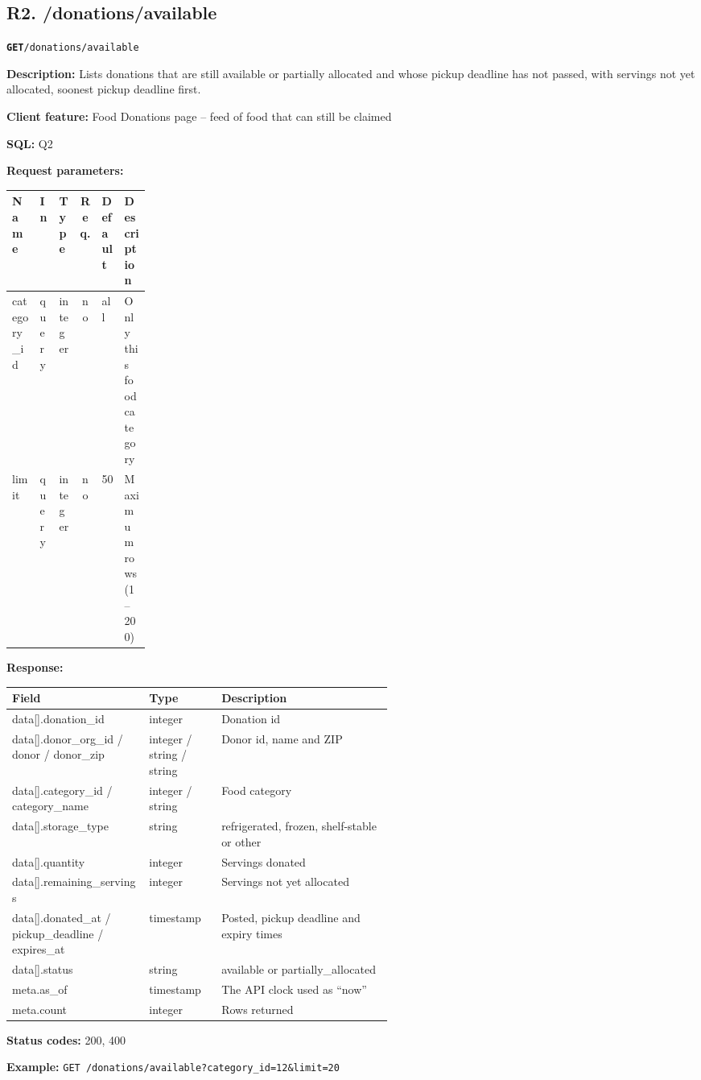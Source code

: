 \documentclass[11pt,letterpaper]{article}
\newcommand{\brk}{\penalty0\relax}
\newcommand{\routebar}[2]{%
  \par\noindent\colorbox{boxGray}{\parbox{\dimexpr\linewidth-2\fboxsep}{%
  \strut\textbf{\texttt{#1}}\quad\texttt{#2}\strut}}\par\smallskip}
\newcommand{\kv}[2]{\textbf{#1:} #2\par}
\begin{document}
\subsection*{R2. /donations/available}
\routebar{GET}{/donations/available}
\kv{Description}{Lists donations that are still available or partially allocated and whose pickup deadline has not passed, with servings not yet allocated, soonest pickup deadline first.}
\kv{Client feature}{Food Donations page -- feed of food that can still be claimed}
\kv{SQL}{Q2}
\kv{Request parameters}{}
\begin{xltabular}{\linewidth}{>{\ttfamily\raggedright\arraybackslash}p{0.2\linewidth} l l c l >{\raggedright\arraybackslash}X}
\toprule
\textrm{\textbf{Name}} & \textbf{In} & \textbf{Type} & \textbf{Req.} & \textbf{Default} & \textbf{Description} \\
\midrule
category\_\brk{}id & query & integer & no & all & Only this food category \\
limit & query & integer & no & 50 & Maximum rows (1--200) \\
\bottomrule
\end{xltabular}
\kv{Response}{}
\begin{xltabular}{\linewidth}{>{\ttfamily\raggedright\arraybackslash}p{0.36\linewidth} >{\raggedright\arraybackslash}p{0.19\linewidth} >{\raggedright\arraybackslash}X}
\toprule
\textrm{\textbf{Field}} & \textbf{Type} & \textbf{Description} \\
\midrule
data[].\brk{}donation\_id & integer & Donation id \\
data[].\brk{}donor\_org\_id /\brk{} donor /\brk{} donor\_zip & integer / string / string & Donor id, name and ZIP \\
data[].\brk{}category\_id /\brk{} category\_name & integer / string & Food category \\
data[].\brk{}storage\_type & string & refrigerated, frozen, shelf-stable or other \\
data[].\brk{}quantity & integer & Servings donated \\
data[].\brk{}remaining\_servings & integer & Servings not yet allocated \\
data[].\brk{}donated\_at /\brk{} pickup\_deadline /\brk{} expires\_at & timestamp & Posted, pickup deadline and expiry times \\
data[].\brk{}status & string & available or partially\_allocated \\
meta.\brk{}as\_of & timestamp & The API clock used as ``now'' \\
meta.\brk{}count & integer & Rows returned \\
\bottomrule
\end{xltabular}
\kv{Status codes}{200, 400}
{\raggedright\textbf{Example:} {\small \texttt{GET /\brk{}donations/\brk{}available?\brk{}category\_id=\brk{}12\&\brk{}limit=\brk{}20}}\par}
\end{document}

